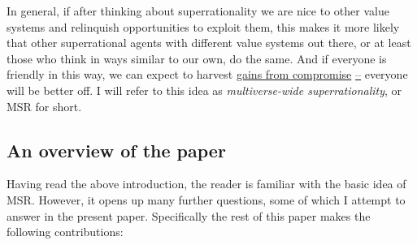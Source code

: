In general, if after thinking about superrationality we are nice to
other value systems and relinquish opportunities to exploit them, this
makes it more likely that other superrational agents with different
value systems out there, or at least those who think in ways similar to
our own, do the same. And if everyone is friendly in this way, we can
expect to harvest
\href{https://foundational-research.org/gains-from-trade-through-compromise/}{gains
from compromise}
\href{https://foundational-research.org/gains-from-trade-through-compromise/}{--}
everyone will be better off. I will refer to this idea as
\emph{multiverse-wide superrationality}, or MSR for short.

\hypertarget{an-overview-of-the-paper}{\subsection{An overview of the
paper}\label{an-overview-of-the-paper}}

Having read the above introduction, the reader is familiar with the
basic idea of MSR. However, it opens up many further questions, some of
which I attempt to answer in the present paper. Specifically the rest of
this paper makes the following contributions:

